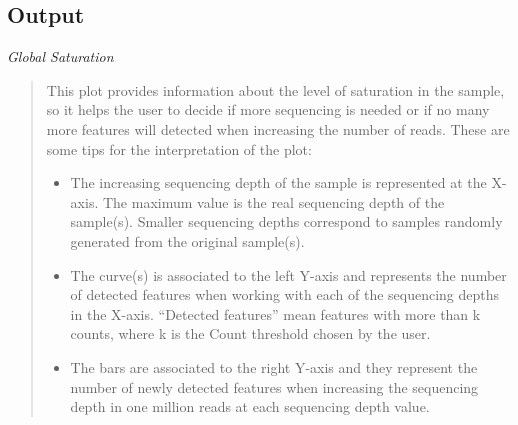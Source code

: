 \documentclass[a4paper,10pt,english]{sphinxmanual}
\begin{document}
\subsection{Output}
\label{analysis:id5}
\emph{Global Saturation}
\begin{quote}

This plot provides information about the level of saturation in the sample, so it helps the user to decide if more sequencing is needed or if no many more features will detected when increasing the number of reads. These are some tips for the interpretation of the plot:
\begin{itemize}
\item {} 
The increasing sequencing depth of the sample is represented at the X-axis. The maximum value is the real sequencing depth of the sample(s). Smaller sequencing depths correspond to samples   randomly generated from the original sample(s).

\item {} 
The curve(s) is associated to the left Y-axis and represents the number of detected features when working with each of the sequencing depths in the X-axis. “Detected features” mean features with more than k counts, where k is the Count threshold chosen by the user.

\item {} 
The bars are associated to the right Y-axis and they represent the number of newly detected features when increasing the sequencing depth in one million reads at each sequencing depth value.

\end{itemize}
\end{quote}
\end{document}
